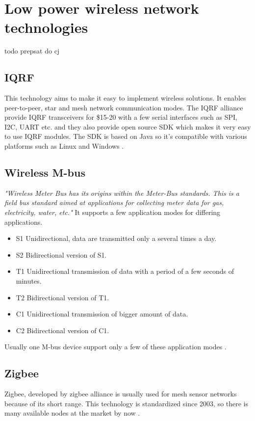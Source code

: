 \chapter{Low power wireless network technologies}
todo prepsat do cj

\section{IQRF}
This technology aims to make it easy to implement wireless solutions. It enables peer-to-peer, star and mesh network communication modes. The IQRF alliance provide IQRF transceivers for \$15-20 with a few serial interfaces such as SPI, I2C, UART etc. and they also provide open source SDK which makes it very easy to use IQRF modules. The SDK is based on Java so it's compatible with various platforms such as Linux and Windows
\cite{1} \cite{2} \cite{3} \cite{4}.


\section{Wireless M-bus}
\textit{"Wireless Meter Bus has its origins within the Meter-Bus standards. This is a field bus standard aimed at applications for collecting meter data for gas, electricity, water, etc."} \cite{5}
It supports a few application modes for differing applications.
\begin{itemize}
  \item S1  Unidirectional, data are transmitted only a several times a day.
  \item S2	Bidirectional version of S1.
  \item	T1	Unidirectional transmission of data with a period of a few seconds of minutes.
  \item T2	Bidirectional version of T1.
  \item C1	Unidirectional transmission of bigger amount of data.
  \item C2	Bidirectional version of C1.
\end{itemize}
Usually one M-bus device support only a few of these application modes \cite{5} \cite{6} \cite{7} \cite{8}.


\section{Zigbee}
Zigbee, developed by zigbee alliance is usually used for mesh sensor networks because of its short range. This technology is standardized since 2003, so there is many available nodes at the market by now \cite{10} \cite{11} \cite{12}.

